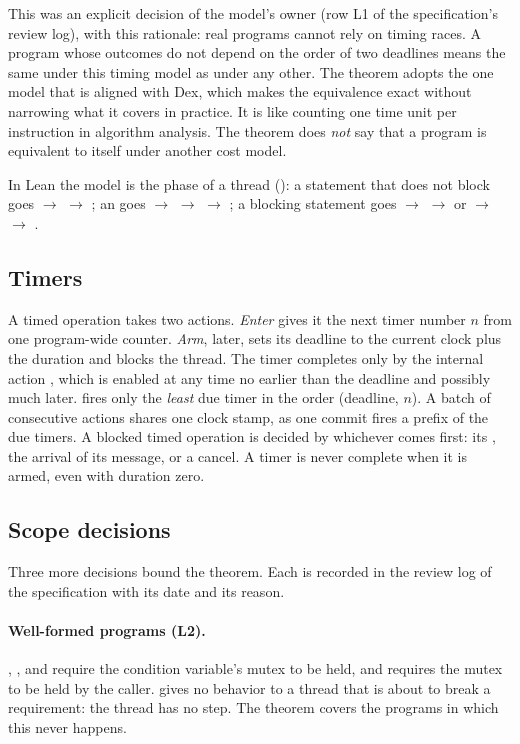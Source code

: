 This was an explicit decision of the model's owner (row L1 of the
specification's review log), with this rationale: real programs cannot rely
on timing races. A program whose outcomes do not depend on the order of two
deadlines means the same under this timing model as under any other. The
theorem adopts the one model that is aligned with Dex, which makes the
equivalence exact without narrowing what it covers in practice. It is like
counting one time unit per instruction in algorithm analysis. The theorem
does \emph{not} say that a program is equivalent to itself under another
cost model.

In Lean the model is the phase of a thread (): a statement
that does not block goes  $\to$  $\to$
; an  goes  $\to$  $\to$
 $\to$ ; a blocking statement goes 
$\to$  $\to$  or  $\to$
 $\to$ .

\subsection{Timers}
\label{sec:timers}

A timed operation takes two actions. \emph{Enter} gives it the next timer
number $n$ from one program-wide counter. \emph{Arm}, later, sets its
deadline to the current clock plus the duration and blocks the thread. The
timer completes only by the internal action , which is enabled at
any time no earlier than the deadline and possibly much later. 
fires only the \emph{least} due timer in the order (deadline, $n$). A batch
of consecutive  actions shares one clock stamp, as one
 commit fires a prefix of the due timers. A blocked
timed operation is decided by whichever comes first: its , the
arrival of its message, or a cancel. A timer is never complete when it is
armed, even with duration zero.

\subsection{Scope decisions}
\label{sec:scope}

Three more decisions bound the theorem. Each is recorded in the review log
of the specification with its date and its reason.

\paragraph{Well-formed programs (L2).}
, , and  require the condition variable's
mutex to be held, and  requires the mutex to be held by the
caller. \Lang{} gives no behavior to a thread that is about to break a
requirement: the thread has no step. The theorem covers the programs in
which this never happens.


